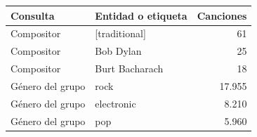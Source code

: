 \begin{center}\small
{}\label{tab:evidencia_ampliacion}
\begin{tabularx}{\linewidth}{@{}p{3.0cm} Y r@{}}
\toprule
\textbf{Consulta} & \textbf{Entidad o etiqueta} & \textbf{Canciones} \\
\midrule
Compositor & [traditional] & 61 \\
Compositor & Bob Dylan & 25 \\
Compositor & Burt Bacharach & 18 \\
Género del grupo & rock & 17.955 \\
Género del grupo & electronic & 8.210 \\
Género del grupo & pop & 5.960 \\
\bottomrule
\end{tabularx}
\end{center}
